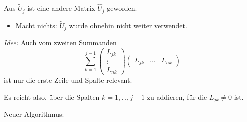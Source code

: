 Aus $\widetilde{U}_j$ ist eine andere Matrix $\widehat{U}_j$ geworden.
\begin{itemize}
 \item Macht nichts: $\widetilde{U}_j$ wurde ohnehin nicht weiter verwendet.
\end{itemize}

\bigskip

\emph{Idee:} Auch vom zweiten Summanden
\begin{equation*}
  -
  \sum_{k=1}^{j-1}
  \begin{pmatrix}
   L_{jk} \\
   \vdots \\
   L_{nk}
  \end{pmatrix}
  \begin{pmatrix}
   L_{jk} & \ldots & L_{nk}
  \end{pmatrix}
\end{equation*}
ist nur die erste Zeile und Spalte relevant.

Es reicht also, über die Spalten $k=1,\dots,j-1$ zu addieren, für die $L_{jk} \neq 0$ ist.

\medskip

Neuer Algorithmus:

